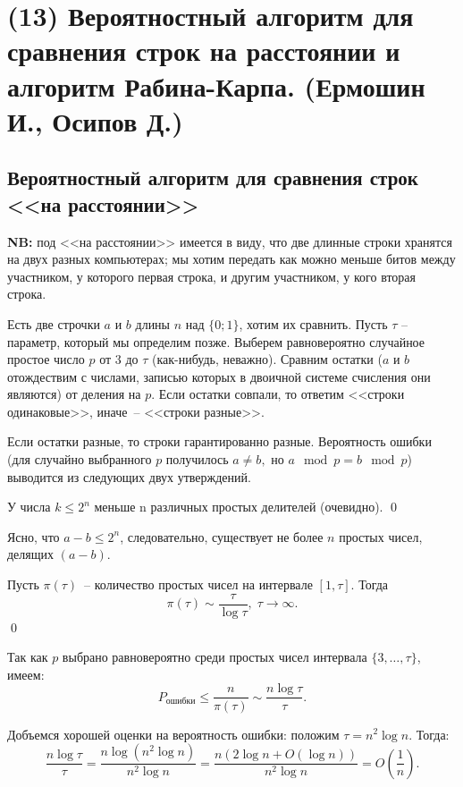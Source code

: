 \section{(13) Вероятностный алгоритм для сравнения строк на расстоянии и алгоритм Рабина-Карпа. (Ермошин И., Осипов Д.)}

\subsection{Вероятностный алгоритм для сравнения строк <<на расстоянии>>}

\textbf{NB: }под <<на расстоянии>> имеется в виду, что две длинные строки хранятся на двух разных компьютерах; мы хотим передать как можно меньше битов между участником, у которого первая строка, и другим участником, у кого вторая строка. 

Есть две строчки $a$ и $b$ длины $n$ над $\{0;1\}$, хотим их сравнить. Пусть $\tau$ -- параметр, который мы определим позже. Выберем равновероятно случайное простое число $p$ от 3 до $\tau$ (как-нибудь, неважно). Сравним остатки ($a$ и $b$ отождествим с числами, записью которых в двоичной системе счисления они являются) от деления на $p$. Если остатки совпали, то ответим <<строки одинаковые>>, иначе~-- <<строки разные>>.

Если остатки разные, то строки гарантированно разные. Вероятность ошибки (для случайно выбранного $p$ получилось $a\neq b,$ но $a\mod{p}=b\mod{p}$) выводится из следующих двух утверждений.

\begin{lemma*}
У числа $k\le 2^n$ меньше n различных простых делителей (очевидно). \qed
\end{lemma*}

Ясно, что $a-b\le 2^n$, следовательно, существует не более $n$ простых чисел, делящих $(a-b)$. 

\begin{theorem*}
Пусть $\pi(\tau)$~-- количество простых чисел на интервале $[1, \tau]$. Тогда 
$$\pi(\tau) \sim \frac{\tau}{\log\tau}, \; \tau\rightarrow\infty.$$ \qed
\end{theorem*} 

Так как $p$ выбрано равновероятно среди простых чисел интервала $\{3, \ldots, \tau\}$, имеем: $$P_{\text{ошибки}}\le\frac{n}{\pi(\tau)} \sim \frac{n\log\tau}{\tau}.$$ 

Добъемся хорошей оценки на вероятность ошибки: положим $\tau = n^2 \log n$. Тогда:
$$\frac{n\log\tau}{\tau} = \frac{n\log(n^2\log n)}{n^2\log n} = \frac{n(2\log n + O(\log n))}{n^2\log n} = O(\frac{1}{n}).$$

